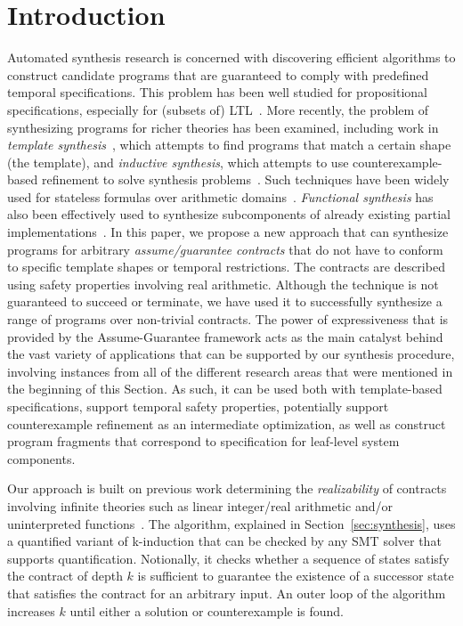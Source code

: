 \newcommand{\toolname}{RealSynth}


\section{Introduction}
Automated synthesis research is concerned with discovering efficient algorithms to construct candidate programs that are guaranteed to comply with predefined temporal specifications.  This problem has been well studied for propositional specifications, especially for (subsets of) LTL~\cite{gulwani2010dimensions}.  More recently, the problem of synthesizing programs for richer theories has been examined, including work in {\em template synthesis}~\cite{srivastava2013template}, which attempts to find programs that match a certain shape (the template), and {\em inductive synthesis}, which attempts to use counterexample-based refinement to solve synthesis problems~\cite{flener2001inductive}.  Such techniques have been widely used for stateless formulas over arithmetic domains~\cite{reynoldscounterexample}.  
\textit{Functional synthesis} has also been effectively used to synthesize
subcomponents of already existing partial
implementations~\cite{kuncak2010complete,kuncak2013functional}. In this paper,
we propose a new approach that can synthesize programs for arbitrary {\em
assume/guarantee contracts} that do not have to conform to specific template
shapes or temporal restrictions. The contracts are described using
safety properties involving real arithmetic.  Although the
technique is not guaranteed to succeed or terminate, we have used it to successfully synthesize a range of programs over non-trivial contracts.
The power of expressiveness that is provided by the Assume-Guarantee framework
acts as the main catalyst behind the vast variety of applications that can be
supported by our synthesis procedure, involving instances from all of the
different research areas that were mentioned in the beginning of this Section.
As such, it can be used both with template-based specifications, support
temporal safety properties, potentially support counterexample refinement as an
intermediate optimization, as well as construct program fragments that
correspond to specification for leaf-level system components.

Our approach is built on previous work determining the {\em realizability} of contracts involving infinite theories such as linear integer/real arithmetic and/or uninterpreted functions~\cite{Katis15:Realizability,katis2015machine}.  The algorithm, explained in Section~\ref{sec:synthesis}, uses a quantified variant of k-induction that can be checked by any SMT solver that supports quantification.  Notionally, it checks whether a sequence of states satisfy the contract of depth $k$ is sufficient to guarantee the existence of a successor state that satisfies the contract for an arbitrary input.  An outer loop of the algorithm increases $k$ until either a solution or counterexample is found.  


